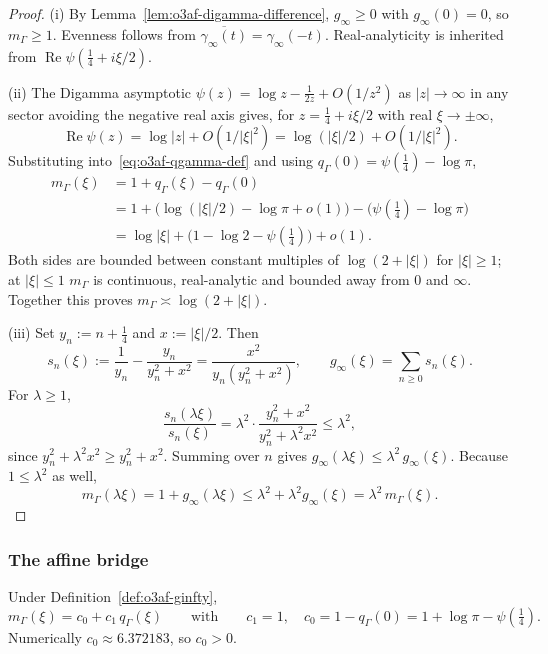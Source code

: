 \begin{proof}
(i) By Lemma~\ref{lem:o3af-digamma-difference},
\(g_\infty\ge0\) with \(g_\infty(0)=0\), so \(m_\Gamma\ge1\).  Evenness follows
from \(\overline{\gamma_\infty(t)}=\gamma_\infty(-t)\).  Real-analyticity is
inherited from \(\operatorname{Re}\psi(\tfrac14+i\xi/2)\).

(ii) The Digamma asymptotic
\(\psi(z)=\log z-\tfrac{1}{2z}+O(1/z^2)\) as \(|z|\to\infty\) in any sector
avoiding the negative real axis gives, for \(z=\tfrac14+i\xi/2\) with real
\(\xi\to\pm\infty\),
\[
 \operatorname{Re}\psi(z)=\log|z|+O(1/|\xi|^2)=\log(|\xi|/2)+O(1/|\xi|^2).
\]
Substituting into~\eqref{eq:o3af-qgamma-def} and using
\(q_\Gamma(0)=\psi(\tfrac14)-\log\pi\),
\begin{align*}
 m_\Gamma(\xi)
 &=1+q_\Gamma(\xi)-q_\Gamma(0)\\
 &=1+\bigl(\log(|\xi|/2)-\log\pi+o(1)\bigr)-\bigl(\psi(\tfrac14)-\log\pi\bigr)\\
 &=\log|\xi|+\bigl(1-\log 2-\psi(\tfrac14)\bigr)+o(1).
\end{align*}
Both sides are bounded between constant multiples of \(\log(2+|\xi|)\) for
\(|\xi|\ge1\); at \(|\xi|\le1\) \(m_\Gamma\) is continuous, real-analytic
and bounded away from \(0\) and \(\infty\).  Together this proves
\(m_\Gamma\asymp\log(2+|\xi|)\).

(iii) Set \(y_n:=n+\tfrac14\) and \(x:=|\xi|/2\).  Then
\[
 s_n(\xi):=\frac1{y_n}-\frac{y_n}{y_n^2+x^2}
 =\frac{x^2}{y_n(y_n^2+x^2)},
 \qquad
 g_\infty(\xi)=\sum_{n\ge0}s_n(\xi).
\]
For \(\lambda\ge1\),
\[
 \frac{s_n(\lambda\xi)}{s_n(\xi)}
 =\lambda^2\cdot\frac{y_n^2+x^2}{y_n^2+\lambda^2x^2}
 \le\lambda^2,
\]
since \(y_n^2+\lambda^2x^2\ge y_n^2+x^2\).  Summing over \(n\) gives
\(g_\infty(\lambda\xi)\le\lambda^2\,g_\infty(\xi)\).
Because \(1\le\lambda^2\) as well,
\[
 m_\Gamma(\lambda\xi)
 =1+g_\infty(\lambda\xi)
 \le\lambda^2+\lambda^2g_\infty(\xi)
 =\lambda^2\,m_\Gamma(\xi).
\]
\end{proof}

\subsubsection*{The affine bridge}

\begin{corollary}
\label{cor:o3af-symbol-bridge}
Under Definition~\ref{def:o3af-ginfty},
\[
 \boxed{
 m_\Gamma(\xi)=c_0+c_1\,q_\Gamma(\xi)
 \qquad\text{with}\qquad
 c_1=1,\quad
 c_0=1-q_\Gamma(0)=1+\log\pi-\psi(\tfrac14).
 }
\tag{O3AF.4}\label{eq:o3af-affine-bridge}
\]
Numerically \(c_0\approx6.372183\), so \(c_0>0\).
\end{corollary}

